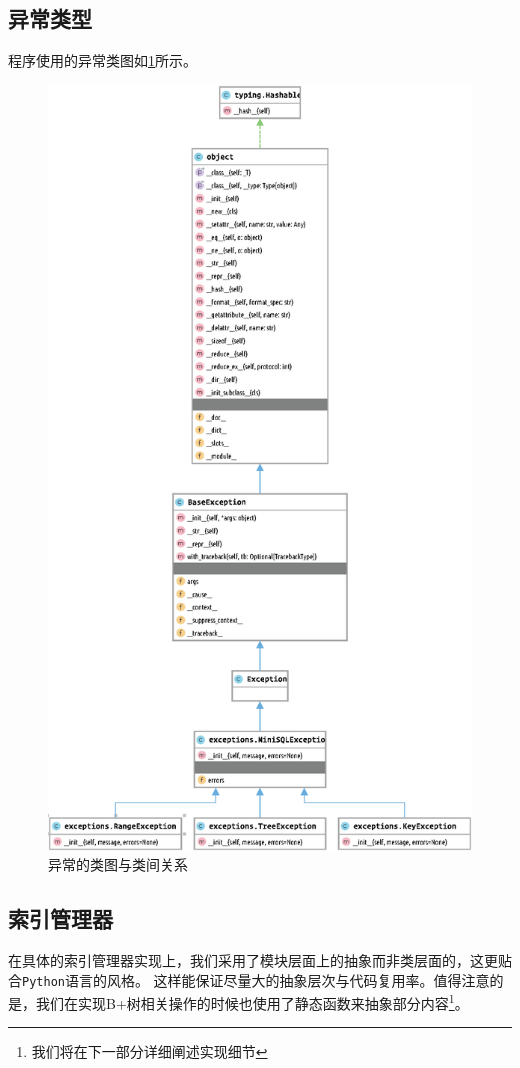 \documentclass[UTF8]{ctexrep} %
\begin{document}
\subsection{异常类型}
程序使用的异常类图如\ref{fig:exceptions_diagram}所示。
\begin{figure}[H]
    \centering
    \includegraphics[width=0.7\linewidth]{figure/exceptions.eps}
    \caption{异常的类图与类间关系}
    \label{fig:exceptions_diagram}
\end{figure}
\subsection{索引管理器}
在具体的索引管理器实现上，我们采用了模块层面上的抽象而非类层面的，这更贴合\texttt{Python}语言的风格。
这样能保证尽量大的抽象层次与代码复用率。值得注意的是，我们在实现B+树相关操作的时候也使用了静态函数来抽象部分内容\footnote{我们将在下一部分详细阐述实现细节}。
\end{document}

